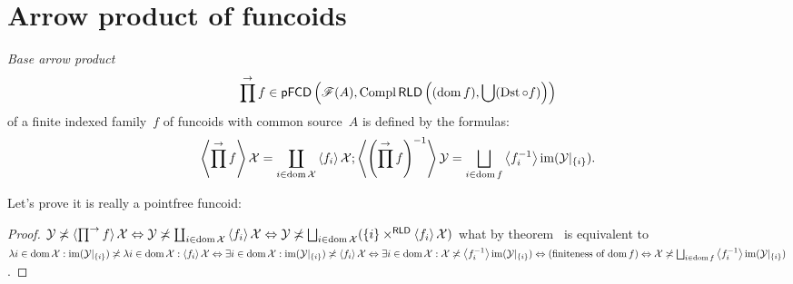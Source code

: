 \section{Arrow product of funcoids}

\begin{defn}
\emph{Base arrow product} \[ \prod^{\rightarrow}f\in\mathsf{pFCD}\left(\mathscr{F}(A),\operatorname{Compl}\mathsf{RLD}\left((\operatorname{dom} f),\bigcup(\operatorname{Dst}\circ f)\right)\right) \] of a finite indexed family~$f$ of funcoids with common source~$A$ is defined by the formulas:
\[
\supfun{\prod^{\rightarrow} f}\mathcal{X} = \coprod_{i\in\dom\mathcal{X}}\supfun{f_i}\mathcal{X};
\supfun{\left(\prod^{\rightarrow} f\right)^{-1}}\mathcal{Y} = \bigsqcup_{i\in\dom f}\supfun{f_i^{-1}}\im(\mathcal{Y}|_{\{i\}}).
\]
\end{defn}

Let's prove it is really a pointfree funcoid:

\begin{proof}
$\mathcal{Y}\nasymp\supfun{\prod^{\rightarrow} f}\mathcal{X}
\Leftrightarrow
\mathcal{Y}\nasymp\coprod_{i\in\dom\mathcal{X}}\supfun{f_i}\mathcal{X}
\Leftrightarrow
\mathcal{Y}\nasymp\bigsqcup_{i\in\dom\mathcal{X}}(\{i\}\times^{\mathsf{RLD}}\supfun{f_i}\mathcal{X})$
what by theorem~ is equivalent to
$\lambda i\in\dom\mathcal{X}:\im(\mathcal{Y}|_{\{i\}})\nasymp
\lambda i\in\dom\mathcal{X}:\supfun{f_i}\mathcal{X}
\Leftrightarrow
\exists i\in\dom\mathcal{X}:\im(\mathcal{Y}|_{\{i\}})\nasymp
\supfun{f_i}\mathcal{X}
\Leftrightarrow
\exists i\in\dom\mathcal{X}:\mathcal{X}\nasymp\supfun{f_i^{-1}}\im(\mathcal{Y}|_{\{i\}})
\Leftrightarrow\text{(finiteness of $\dom f$)}\Leftrightarrow
\mathcal{X}\nasymp\bigsqcup_{i\in\dom f}\supfun{f_i^{-1}}\im(\mathcal{Y}|_{\{i\}})$.
\end{proof}